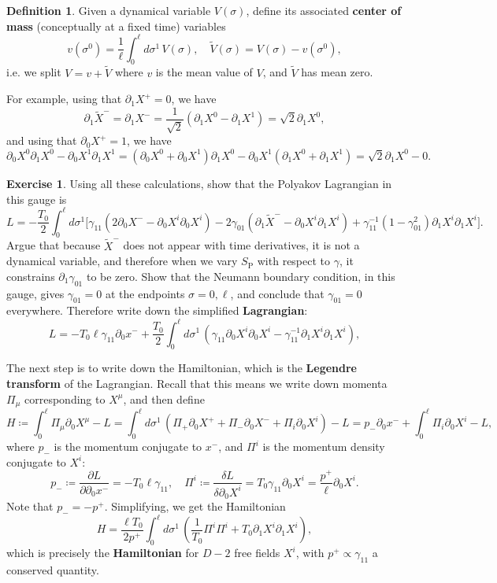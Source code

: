 \documentclass{report}
\theoremstyle{plain}
\theoremstyle{definition}
\newtheorem{definition}[theorem]{Definition}
\newtheorem{exercise}{Exercise}[section]
\theoremstyle{remark}
\newcommand{\di}{\partial}
\newcommand{\pder}[2]{\frac{\partial #1}{\partial #2}}
\newcommand{\fder}[2]{\frac{\delta #1}{\delta #2}}
\begin{document}
\begin{definition}
  Given a dynamical variable $V(\sigma)$, define its associated {\bf
    center of mass} (conceptually at a fixed time) variables
  \[ v(\sigma^0) = \frac{1}{\ell} \int_0^\ell d\sigma^1 \, V(\sigma), \quad \tilde{V}(\sigma) = V(\sigma) - v(\sigma^0), \]
  i.e. we split $V = v + \tilde{V}$ where $v$ is the mean value of
  $V$, and $\tilde{V}$ has mean zero.
\end{definition}

For example, using that $\di_1X^+ = 0$, we have
\[ \di_1\tilde{X}^- = \di_1X^- = \frac{1}{\sqrt{2}}(\di_1X^0 - \di_1X^1) = \sqrt{2} \di_1X^0, \]
and using that $\di_0X^+ = 1$, we have
\[ \di_0X^0\di_1X^0 - \di_0X^1\di_1X^1 = (\di_0X^0 + \di_0X^1)\di_1X^0 - \di_0X^1(\di_1X^0 + \di_1X^1) = \sqrt{2} \di_1X^0 - 0. \]

\begin{exercise}
  Using all these calculations, show that the Polyakov Lagrangian in
  this gauge is
  \[ L = -\frac{T_0}{2} \int_0^\ell d\sigma^1 \bigg[\gamma_{11}(2\di_0X^- - \di_0X^i\di_0X^i) - 2\gamma_{01}(\di_1\tilde{X}^- - \di_0X^i \di_1X^i) + \gamma_{11}^{-1}(1 - \gamma_{01}^2) \di_1X^i \di_1X^i\bigg]. \]
  Argue that because $\tilde{X}^-$ does not appear with time
  derivatives, it is not a dynamical variable, and therefore when we
  vary $S_{\text{P}}$ with respect to $\gamma$, it constrains
  $\di_1\gamma_{01}$ to be zero. Show that the Neumann boundary
  condition, in this gauge, gives $\gamma_{01} = 0$ at the endpoints
  $\sigma = 0, \ell$, and conclude that $\gamma_{01} = 0$ everywhere.
  Therefore write down the simplified {\bf Lagrangian}:
  \[ L = -T_0\ell \gamma_{11}\di_0 x^- + \frac{T_0}{2} \int_0^\ell d\sigma^1 \, \left(\gamma_{11} \di_0X^i \di_0X^i - \gamma_{11}^{-1} \di_1X^i \di_1X^i\right), \]
\end{exercise}

The next step is to write down the Hamiltonian, which is the {\bf
  Legendre transform} of the Lagrangian. Recall that this means we
write down momenta $\Pi_\mu$ corresponding to $X^\mu$, and then define
\[ H \coloneqq \int_0^\ell \Pi_\mu \di_0 X^\mu - L = \int_0^\ell d\sigma^1 \, \left(\Pi_+\di_0 X^+ + \Pi_-\di_0 X^- + \Pi_i \di_0 X^i\right) - L = p_- \di_0 x^- + \int_0^\ell \Pi_i \di_0 X^i - L, \]
where $p_-$ is the momentum conjugate to $x^-$, and $\Pi^i$ is the
momentum density conjugate to $X^i$:
\[ p_- \coloneqq \pder{L}{\di_0x^-} = -T_0\ell \gamma_{11}, \quad \Pi^i \coloneqq \fder{L}{\di_0X^i} = T_0\gamma_{11}\di_0X^i = \frac{p^+}{\ell} \di_0X^i. \]
Note that $p_- = -p^+$. Simplifying, we get the Hamiltonian
\[ H = \frac{\ell T_0}{2p^+} \int_0^\ell d\sigma^1 \, \left(\frac{1}{T_0} \Pi^i \Pi^i + T_0 \di_1 X^i \di_1 X^i\right), \]
which is precisely the {\bf Hamiltonian} for $D - 2$ free fields
$X^i$, with $p^+ \propto \gamma_{11}$ a conserved quantity.
\end{document}
